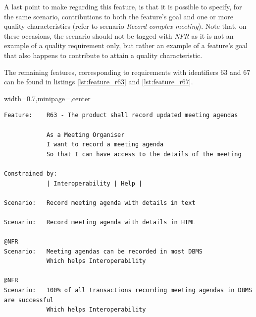 \documentclass[dissertation,final]{softeng}
\newenvironment{featurecode}[1]
{ \lrbox\featurebox \begin{adjustbox}{width=#1\textwidth,minipage=\textwidth,center} }
{ \end{adjustbox}\endlrbox}
\newenvironment{featurelist}[2]
{
\newcommand{\setcaption}{\caption{#1}}
\newcommand{\setlabel}{\label{#2}}
}
{\begin{listing}[h!]\centering\usebox\featurebox\setcaption\setlabel\end{listing}}
\begin{document}
A last point to make regarding this feature, is that it is possible to specify, for the same scenario, contributions to both the feature's goal and one or more quality characteristics (refer to scenario \emph{Record complex meeting}). Note that, on these occasions, the scenario should not be tagged with \emph{NFR} as it is not an example of a quality requirement only, but rather an example of a feature's goal that also happens to contribute to attain a quality characteristic.

The remaining features, corresponding to requirements with identifiers 63 and 67 can be found in listings \ref{lst:feature_r63} and \ref{lst:feature_r67}.

\begin{featurelist}{R63 -- The product shall record updated meeting agendas}{lst:feature_r63}
\begin{featurecode}{0.7}
\begin{verbatim}
Feature:    R63 - The product shall record updated meeting agendas

            As a Meeting Organiser
            I want to record a meeting agenda
            So that I can have access to the details of the meeting
	
Constrained by:
            | Interoperability | Help |

Scenario:   Record meeting agenda with details in text

Scenario:   Record meeting agenda with details in HTML

@NFR	
Scenario:   Meeting agendas can be recorded in most DBMS
            Which helps Interoperability

@NFR	
Scenario:   100% of all transactions recording meeting agendas in DBMS are successful
            Which helps Interoperability
\end{verbatim}
\end{featurecode}
\end{featurelist}
\end{document}
